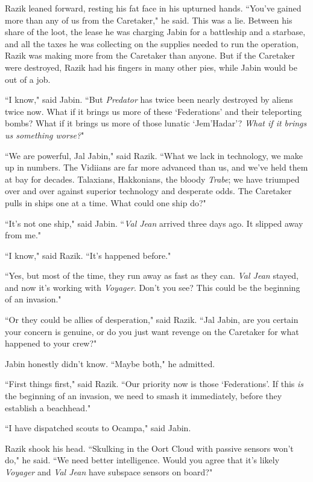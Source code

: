 \documentclass[twoside,letterpaper,12pt]{memoir}
\begin{document}
Razik leaned forward, resting his fat face in his upturned hands. ``You've gained more than any of us from the Caretaker," he said. This was a lie. Between his share of the loot, the lease he was charging Jabin for a battleship and a starbase, and all the taxes he was collecting on the supplies needed to run the operation, Razik was making more from the Caretaker than anyone. But if the Caretaker were destroyed, Razik had his fingers in many other pies, while Jabin would be out of a job.

``I know," said Jabin. ``But \textit{Predator} has twice been nearly destroyed by aliens twice now. What if it brings us more of these `Federations' and their teleporting bombs? What if it brings us more of those lunatic `Jem'Hadar'? \textit{What if it brings us something worse?}"

``We are powerful, Jal Jabin," said Razik. ``What we lack in technology, we make up in numbers. The Vidiians are far more advanced than us, and we've held them at bay for decades. Talaxians, Hakkonians, the bloody \textit{Trabe}; we have triumped over and over against superior technology and desperate odds. The Caretaker pulls in ships one at a time. What could one ship do?"

``It's not one ship," said Jabin. ``\textit{Val Jean} arrived three days ago. It slipped away from me."

``I know," said Razik. ``It's happened before."

``Yes, but most of the time, they run away as fast as they can. \textit{Val Jean} stayed, and now it's working with \textit{Voyager}. Don't you see? This could be the beginning of an invasion."

``Or they could be allies of desperation," said Razik. ``Jal Jabin, are you certain your concern is genuine, or do you just want revenge on the Caretaker for what happened to your crew?"

Jabin honestly didn't know. ``Maybe both," he admitted.

``First things first," said Razik. ``Our priority now is those `Federations'. If this \textit{is} the beginning of an invasion, we need to smash it immediately, before they establish a beachhead."

``I have dispatched scouts to Ocampa," said Jabin.

Razik shook his head. ``Skulking in the Oort Cloud with passive sensors won't do," he said. ``We need better intelligence. Would you agree that it's likely \textit{Voyager} and \textit{Val Jean} have subspace sensors on board?"
\end{document}
